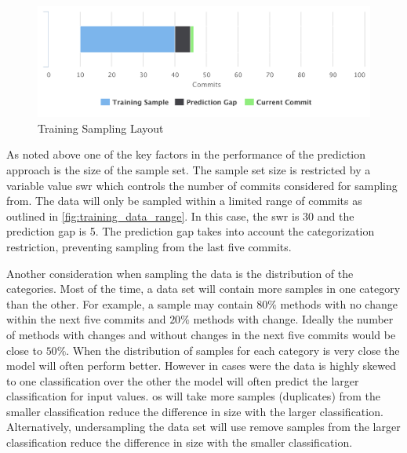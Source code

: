 \begin{figure}[!ht]
    \centering
        \includegraphics[width=1.0\textwidth]{images/training_sampling}
    \caption{Training Sampling Layout}
    \label{fig:training_data_range}
\end{figure}

As noted above one of the key factors in the performance of the prediction approach is the size of the sample set. The sample set size is restricted by a variable value \gls{swr} which controls the number of commits considered for sampling from. The data will only be sampled within a limited range of commits as outlined in \autoref{fig:training_data_range}. In this case, the \gls{swr} is 30 and the prediction gap is 5. The prediction gap takes into account the categorization restriction, preventing sampling from the last five commits.

Another consideration when sampling the data is the distribution of the categories. Most of the time, a data set will contain more samples in one category than the other. For example, a sample may contain $80\%$ methods with no change within the next five commits and $20\%$ methods with change. Ideally the number of methods with changes and without changes in the next five commits would be close to $50\%$. When the distribution of samples for each category is very close the model will often perform better. However in cases were the data is highly skewed to one classification over the other the model will often predict the larger classification for input values. \gls{os} will take more samples (duplicates) from the smaller classification reduce the difference in size with the larger classification. Alternatively, undersampling the data set will use remove samples from the larger classification reduce the difference in size with the smaller classification.

